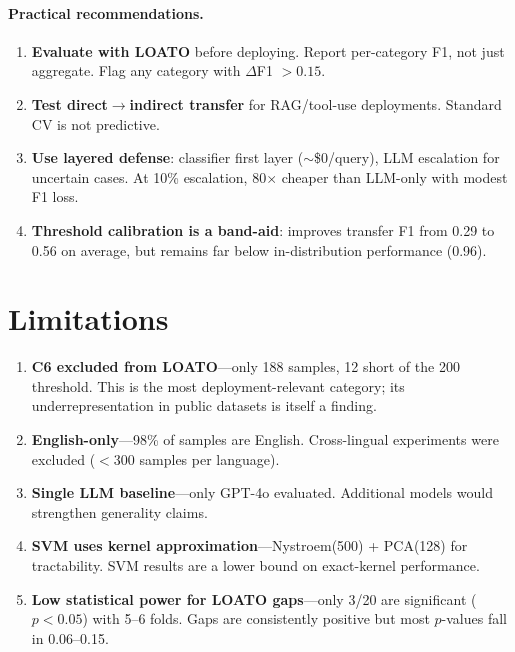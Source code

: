 \documentclass[11pt,a4paper]{article}
\newcommand{\df}{$\Delta$F1}
\newcommand{\Fone}{F1}
\begin{document}
\paragraph{Practical recommendations.}
\begin{enumerate}[nosep,leftmargin=*]
\item \textbf{Evaluate with LOATO} before deploying. Report per-category \Fone{},
  not just aggregate. Flag any category with \df{} $> 0.15$.
\item \textbf{Test direct$\to$indirect transfer} for RAG/tool-use deployments.
  Standard CV is not predictive.
\item \textbf{Use layered defense}: classifier first layer ($\sim$\$0/query),
  LLM escalation for uncertain cases. At 10\% escalation, 80$\times$ cheaper
  than LLM-only with modest \Fone{} loss.
\item \textbf{Threshold calibration is a band-aid}: improves transfer \Fone{}
  from 0.29 to 0.56 on average, but remains far below in-distribution
  performance (0.96).
\end{enumerate}

\section{Limitations}
\label{sec:limitations}

\begin{enumerate}[nosep,leftmargin=*]
\item \textbf{C6 excluded from LOATO}---only 188 samples, 12 short of the 200
  threshold. This is the most deployment-relevant category; its
  underrepresentation in public datasets is itself a finding.
\item \textbf{English-only}---98\% of samples are English. Cross-lingual
  experiments were excluded ($<$300 samples per language).
\item \textbf{Single LLM baseline}---only GPT-4o evaluated. Additional models
  would strengthen generality claims.
\item \textbf{SVM uses kernel approximation}---Nystroem(500) + PCA(128) for
  tractability. SVM results are a lower bound on exact-kernel performance.
\item \textbf{Low statistical power for LOATO gaps}---only 3/20 are significant
  ($p < 0.05$) with 5--6 folds. Gaps are consistently positive but most
  $p$-values fall in 0.06--0.15.
\end{enumerate}
\end{document}
